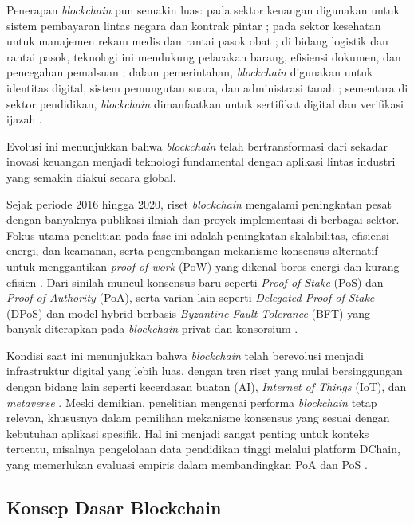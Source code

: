 Penerapan \textit{blockchain} pun semakin luas: pada sektor keuangan digunakan untuk sistem pembayaran lintas negara dan kontrak pintar \cite{jaoude2019, habib2022}; pada sektor kesehatan untuk manajemen rekam medis dan rantai pasok obat \cite{jaoude2019, habib2022}; di bidang logistik dan rantai pasok, teknologi ini mendukung pelacakan barang, efisiensi dokumen, dan pencegahan pemalsuan \cite{mukherjee2021, tijan2019}; dalam pemerintahan, \textit{blockchain} digunakan untuk identitas digital, sistem pemungutan suara, dan administrasi tanah \cite{aljaroodi2019, saari2022}; sementara di sektor pendidikan, \textit{blockchain} dimanfaatkan untuk sertifikat digital dan verifikasi ijazah \cite{chen2018}. 

Evolusi ini menunjukkan bahwa \textit{blockchain} telah bertransformasi dari sekadar inovasi keuangan menjadi teknologi fundamental dengan aplikasi lintas industri yang semakin diakui secara global.

Sejak periode 2016 hingga 2020, riset \textit{blockchain} mengalami peningkatan pesat dengan banyaknya publikasi ilmiah dan proyek implementasi di berbagai sektor. Fokus utama penelitian pada fase ini adalah peningkatan skalabilitas, efisiensi energi, dan keamanan, serta pengembangan mekanisme konsensus alternatif untuk menggantikan \textit{proof-of-work} (PoW) yang dikenal boros energi dan kurang efisien \cite{wang2018, xiao2019, zhang2020}. Dari sinilah muncul konsensus baru seperti \textit{Proof-of-Stake} (PoS) dan \textit{Proof-of-Authority} (PoA), serta varian lain seperti \textit{Delegated Proof-of-Stake} (DPoS) dan model hybrid berbasis \textit{Byzantine Fault Tolerance} (BFT) yang banyak diterapkan pada \textit{blockchain} privat dan konsorsium \cite{nguyen2019, lashkari2021, xu2023, yao2021}.

Kondisi saat ini menunjukkan bahwa \textit{blockchain} telah berevolusi menjadi infrastruktur digital yang lebih luas, dengan tren riset yang mulai bersinggungan dengan bidang lain seperti kecerdasan buatan (AI), \textit{Internet of Things} (IoT), dan \textit{metaverse} \cite{huang2022, yadav2023}. Meski demikian, penelitian mengenai performa \textit{blockchain} tetap relevan, khususnya dalam pemilihan mekanisme konsensus yang sesuai dengan kebutuhan aplikasi spesifik. Hal ini menjadi sangat penting untuk konteks tertentu, misalnya pengelolaan data pendidikan tinggi melalui platform DChain, yang memerlukan evaluasi empiris dalam membandingkan PoA dan PoS \cite{lashkari2021, liu2024}.


\subsection{Konsep Dasar Blockchain}

